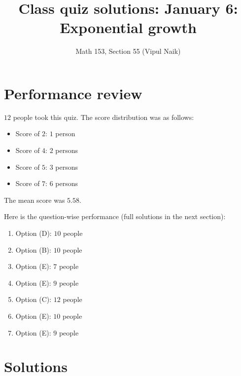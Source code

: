 \documentclass[10pt]{amsart}
\title{Class quiz solutions: January 6: Exponential growth}
\author{Math 153, Section 55 (Vipul Naik)}
\begin{document}
\maketitle

\section{Performance review}

$12$ people took this quiz. The score distribution was as follows:

\begin{itemize}
\item Score of $2$: $1$ person
\item Score of $4$: $2$ persons
\item Score of $5$: $3$ persons
\item Score of $7$: $6$ persons
\end{itemize}

The mean score was $5.58$.

Here is the question-wise performance (full solutions in the next
section):

\begin{enumerate}
\item Option (D): $10$ people
\item Option (B): $10$ people
\item Option (E): $7$ people
\item Option (E): $9$ people
\item Option (C): $12$ people
\item Option (E): $10$ people
\item Option (E): $9$ people
\end{enumerate}

\section{Solutions}
\end{document}
